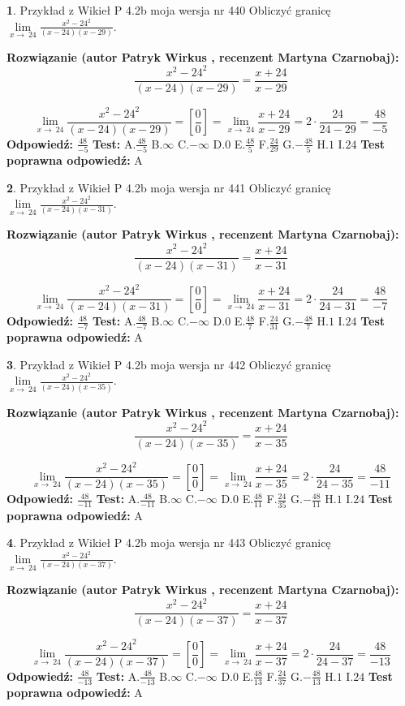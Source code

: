 \documentclass[12pt, a4paper]{article}
\theoremstyle{definition} %
\newtheorem{zad}{}
\newcommand{\zadStart}[1]{\begin{zad}#1\newline}
\newcommand{\zadStop}{\end{zad}}
\newcommand{\rozwStart}[2]{\noindent \textbf{Rozwiązanie (autor #1 , recenzent #2): }\newline}
\newcommand{\rozwStop}{\newline}
\newcommand{\odpStart}{\noindent \textbf{Odpowiedź:}\newline}
\newcommand{\odpStop}{\newline}
\newcommand{\testStart}{\noindent \textbf{Test:}\newline}
\newcommand{\testStop}{\newline}
\newcommand{\kluczStart}{\noindent \textbf{Test poprawna odpowiedź:}\newline}
\newcommand{\kluczStop}{\newline}
\begin{document}
\zadStart{Przykład z Wikieł P 4.2b moja wersja nr 440}
Obliczyć granicę $\lim\limits_{x\to\ 24}\frac{x^{2}-24^{2}}{(x-24)(x-29)}$.
\zadStop
\rozwStart{Patryk Wirkus}{Martyna Czarnobaj}
$$\frac{x^{2}-24^{2}}{(x-24)(x-29)}=\frac{x+24}{x-29}$$

$$\lim\limits_{x\to\ 24}\frac{x^{2}-24^{2}}{(x-24)(x-29)}=[\frac{0}{0}]=\lim\limits_{x\to\ 24}\frac{x+24}{x-29}=2 \cdot \frac{24}{24-29} = \frac{48}{-5}$$
\rozwStop
\odpStart
$\frac{48}{-5}$
\odpStop
\testStart
A.$\frac{48}{-5}$
B.$\infty$
C.$-\infty$
D.$0$
E.$\frac{48}{5}$
F.$\frac{24}{29}$
G.$-\frac{48}{5}$
H.$1$
I.$24$
\testStop
\kluczStart
A
\kluczStop



\zadStart{Przykład z Wikieł P 4.2b moja wersja nr 441}
Obliczyć granicę $\lim\limits_{x\to\ 24}\frac{x^{2}-24^{2}}{(x-24)(x-31)}$.
\zadStop
\rozwStart{Patryk Wirkus}{Martyna Czarnobaj}
$$\frac{x^{2}-24^{2}}{(x-24)(x-31)}=\frac{x+24}{x-31}$$

$$\lim\limits_{x\to\ 24}\frac{x^{2}-24^{2}}{(x-24)(x-31)}=[\frac{0}{0}]=\lim\limits_{x\to\ 24}\frac{x+24}{x-31}=2 \cdot \frac{24}{24-31} = \frac{48}{-7}$$
\rozwStop
\odpStart
$\frac{48}{-7}$
\odpStop
\testStart
A.$\frac{48}{-7}$
B.$\infty$
C.$-\infty$
D.$0$
E.$\frac{48}{7}$
F.$\frac{24}{31}$
G.$-\frac{48}{7}$
H.$1$
I.$24$
\testStop
\kluczStart
A
\kluczStop



\zadStart{Przykład z Wikieł P 4.2b moja wersja nr 442}
Obliczyć granicę $\lim\limits_{x\to\ 24}\frac{x^{2}-24^{2}}{(x-24)(x-35)}$.
\zadStop
\rozwStart{Patryk Wirkus}{Martyna Czarnobaj}
$$\frac{x^{2}-24^{2}}{(x-24)(x-35)}=\frac{x+24}{x-35}$$

$$\lim\limits_{x\to\ 24}\frac{x^{2}-24^{2}}{(x-24)(x-35)}=[\frac{0}{0}]=\lim\limits_{x\to\ 24}\frac{x+24}{x-35}=2 \cdot \frac{24}{24-35} = \frac{48}{-11}$$
\rozwStop
\odpStart
$\frac{48}{-11}$
\odpStop
\testStart
A.$\frac{48}{-11}$
B.$\infty$
C.$-\infty$
D.$0$
E.$\frac{48}{11}$
F.$\frac{24}{35}$
G.$-\frac{48}{11}$
H.$1$
I.$24$
\testStop
\kluczStart
A
\kluczStop



\zadStart{Przykład z Wikieł P 4.2b moja wersja nr 443}
Obliczyć granicę $\lim\limits_{x\to\ 24}\frac{x^{2}-24^{2}}{(x-24)(x-37)}$.
\zadStop
\rozwStart{Patryk Wirkus}{Martyna Czarnobaj}
$$\frac{x^{2}-24^{2}}{(x-24)(x-37)}=\frac{x+24}{x-37}$$

$$\lim\limits_{x\to\ 24}\frac{x^{2}-24^{2}}{(x-24)(x-37)}=[\frac{0}{0}]=\lim\limits_{x\to\ 24}\frac{x+24}{x-37}=2 \cdot \frac{24}{24-37} = \frac{48}{-13}$$
\rozwStop
\odpStart
$\frac{48}{-13}$
\odpStop
\testStart
A.$\frac{48}{-13}$
B.$\infty$
C.$-\infty$
D.$0$
E.$\frac{48}{13}$
F.$\frac{24}{37}$
G.$-\frac{48}{13}$
H.$1$
I.$24$
\testStop
\kluczStart
A
\kluczStop
\end{document}
